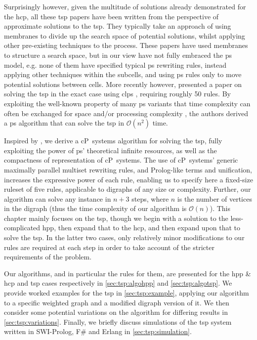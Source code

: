 Surprisingly however, given the multitude of solutions already demonstrated for the \gls{hcp}, all these \gls{tsp} papers have been written from the perspective of approximate solutions to the \gls{tsp}.  They typically take an approach of using membranes to divide up the search space of potential solutions, whilst applying other pre-existing techniques to the process.  These papers have used membranes to structure a search space, but in our view have not fully embraced the \gls{ps} model, e.g. none of them have specified typical \gls{ps} rewriting rules, instead applying other techniques within the subcells, and using \gls{ps} rules only to move potential solutions between cells.  More recently however, \citeauthor{Guo2017} presented a paper on solving the \gls{tsp} in the exact case using \gls{clps} \cite{Guo2017}, requiring roughly 50 rules.  By exploiting the well-known property of many \gls{ps} variants that time complexity can often be exchanged for space and/or processing complexity \cite{Paun1999,Paun2002a,Jimenez2003,Song2017}, the authors derived a \gls{ps} algorithm that can solve the \gls{tsp} in \(\mathcal{O}(n^2)\) time.

Inspired by \cite{Guo2017}, we derive a cP~systems algorithm for solving the \gls{tsp}, fully exploiting the power of \gls{ps}' theoretical infinite resources, as well as the compactness of representation of cP~systems.  The use of cP~systems' generic maximally parallel multiset rewriting rules, and Prolog-like terms and unification, increases the expressive power of each rule, enabling us to specify here a fixed-size ruleset of five rules, applicable to digraphs of any size or complexity.   Further, our algorithm can solve any instance in \(n + 3\) steps, where \(n\) is the number of vertices in the digraph (thus the time complexity of our algorithm is \(\mathcal{O}(n)\)).  This chapter mainly focuses on the \gls{tsp}, though we begin with a solution to the less-complicated \gls{hpp}, then expand that to the \gls{hcp}, and then expand upon that to solve the \gls{tsp}.  In the latter two cases, only relatively minor modifications to our rules are required at each step in order to take account of the stricter requirements of the problem.

Our algorithms, and in particular the rules for them, are presented for the \gls{hpp} \& \gls{hcp} and \gls{tsp} cases respectively in \autoref{sec:tsp:algohpp} and \autoref{sec:tsp:algotsp}.  We provide worked examples for the \gls{tsp} in \autoref{sec:tsp:example}, applying our algorithm to a specific weighted graph and a modified digraph version of it.  We then consider some potential variations on the algorithm for differing results in \autoref{sec:tsp:variations}.  Finally, we briefly discuss simulations of the \gls{tsp} system written in SWI-Prolog, F\# and Erlang in \autoref{sec:tsp:simulation}.